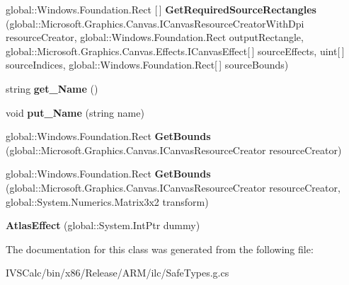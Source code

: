 \begin{DoxyCompactItemize}
\item 
\mbox{\label{class_microsoft_1_1_graphics_1_1_canvas_1_1_effects_1_1_atlas_effect_a47d5ad2213ef6560392de2aa9dba9ac5}} 
global\+::\+Windows.\+Foundation.\+Rect \mbox{[}$\,$\mbox{]} {\bfseries Get\+Required\+Source\+Rectangles} (global\+::\+Microsoft.\+Graphics.\+Canvas.\+I\+Canvas\+Resource\+Creator\+With\+Dpi resource\+Creator, global\+::\+Windows.\+Foundation.\+Rect output\+Rectangle, global\+::\+Microsoft.\+Graphics.\+Canvas.\+Effects.\+I\+Canvas\+Effect\mbox{[}$\,$\mbox{]} source\+Effects, uint\mbox{[}$\,$\mbox{]} source\+Indices, global\+::\+Windows.\+Foundation.\+Rect\mbox{[}$\,$\mbox{]} source\+Bounds)
\item 
\mbox{\label{class_microsoft_1_1_graphics_1_1_canvas_1_1_effects_1_1_atlas_effect_a902afae189388ba6ee558b945f702ce9}} 
string {\bfseries get\+\_\+\+Name} ()
\item 
\mbox{\label{class_microsoft_1_1_graphics_1_1_canvas_1_1_effects_1_1_atlas_effect_ac8e055fa19cdf099c03e817518eb3a22}} 
void {\bfseries put\+\_\+\+Name} (string name)
\item 
\mbox{\label{class_microsoft_1_1_graphics_1_1_canvas_1_1_effects_1_1_atlas_effect_aa4b944d340dc47c1e8de93692bf057fb}} 
global\+::\+Windows.\+Foundation.\+Rect {\bfseries Get\+Bounds} (global\+::\+Microsoft.\+Graphics.\+Canvas.\+I\+Canvas\+Resource\+Creator resource\+Creator)
\item 
\mbox{\label{class_microsoft_1_1_graphics_1_1_canvas_1_1_effects_1_1_atlas_effect_af407ba20dad039a6d8dbb231b3b3718d}} 
global\+::\+Windows.\+Foundation.\+Rect {\bfseries Get\+Bounds} (global\+::\+Microsoft.\+Graphics.\+Canvas.\+I\+Canvas\+Resource\+Creator resource\+Creator, global\+::\+System.\+Numerics.\+Matrix3x2 transform)
\item 
\mbox{\label{class_microsoft_1_1_graphics_1_1_canvas_1_1_effects_1_1_atlas_effect_a9224bd02ca7d3b31765c8f85e77066bd}} 
{\bfseries Atlas\+Effect} (global\+::\+System.\+Int\+Ptr dummy)
\end{DoxyCompactItemize}


The documentation for this class was generated from the following file\+:\begin{DoxyCompactItemize}
\item 
I\+V\+S\+Calc/bin/x86/\+Release/\+A\+R\+M/ilc/Safe\+Types.\+g.\+cs\end{DoxyCompactItemize}
